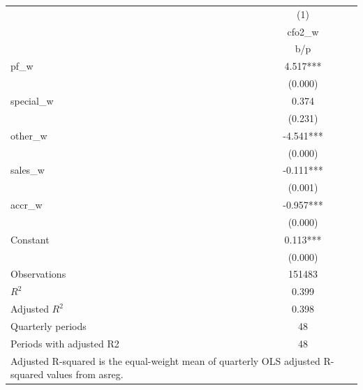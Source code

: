 {
\def\sym#1{\ifmmode^{#1}\else\(^{#1}\)\fi}
\begin{tabular}{l*{1}{c}}
\hline\hline
                    &\multicolumn{1}{c}{(1)}\\
                    &\multicolumn{1}{c}{cfo2\_w}\\
                    &         b/p   \\
\hline
pf\_w                &       4.517***\\
                    &     (0.000)   \\
special\_w           &       0.374   \\
                    &     (0.231)   \\
other\_w             &      -4.541***\\
                    &     (0.000)   \\
sales\_w             &      -0.111***\\
                    &     (0.001)   \\
accr\_w              &      -0.957***\\
                    &     (0.000)   \\
Constant            &       0.113***\\
                    &     (0.000)   \\
\hline
Observations        &      151483   \\
\(R^{2}\)           &       0.399   \\
Adjusted \(R^{2}\)  &       0.398   \\
Quarterly periods   &          48   \\
Periods with adjusted R2&          48   \\
\hline\hline
\multicolumn{2}{l}{\footnotesize Adjusted R-squared is the equal-weight mean of quarterly OLS adjusted R-squared values from asreg.}\\
\end{tabular}
}
